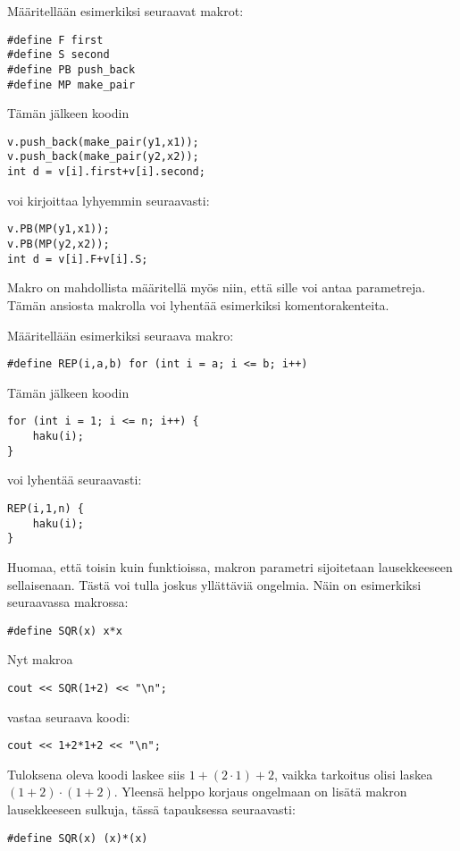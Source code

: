 Määritellään esimerkiksi seuraavat makrot:
\begin{lstlisting}
#define F first
#define S second
#define PB push_back
#define MP make_pair
\end{lstlisting}
Tämän jälkeen koodin
\begin{lstlisting}
v.push_back(make_pair(y1,x1));
v.push_back(make_pair(y2,x2));
int d = v[i].first+v[i].second;
\end{lstlisting}
voi kirjoittaa lyhyemmin seuraavasti:
\begin{lstlisting}
v.PB(MP(y1,x1));
v.PB(MP(y2,x2));
int d = v[i].F+v[i].S;
\end{lstlisting}
Makro on mahdollista määritellä myös niin,
että sille voi antaa parametreja.
Tämän ansiosta makrolla voi lyhentää esimerkiksi
komentorakenteita.

Määritellään esimerkiksi seuraava makro:
\begin{lstlisting}
#define REP(i,a,b) for (int i = a; i <= b; i++)
\end{lstlisting}

Tämän jälkeen koodin
\begin{lstlisting}
for (int i = 1; i <= n; i++) {
    haku(i);
}
\end{lstlisting}
voi lyhentää seuraavasti:
\begin{lstlisting}
REP(i,1,n) {
    haku(i);
}
\end{lstlisting}

Huomaa, että toisin kuin funktioissa,
makron parametri sijoitetaan lausekkeeseen
sellaisenaan.
Tästä voi tulla joskus yllättäviä ongelmia.
Näin on esimerkiksi seuraavassa makrossa:

\begin{lstlisting}
#define SQR(x) x*x
\end{lstlisting}

Nyt makroa
\begin{lstlisting}
cout << SQR(1+2) << "\n";
\end{lstlisting}
vastaa seuraava koodi:
\begin{lstlisting}
cout << 1+2*1+2 << "\n";
\end{lstlisting}

Tuloksena oleva koodi laskee siis $1+(2 \cdot 1)+2$,
vaikka tarkoitus olisi laskea $(1+2) \cdot (1+2)$.
Yleensä helppo korjaus ongelmaan on lisätä makron
lausekkeeseen sulkuja, tässä tapauksessa seuraavasti:

\begin{lstlisting}
#define SQR(x) (x)*(x)
\end{lstlisting}

